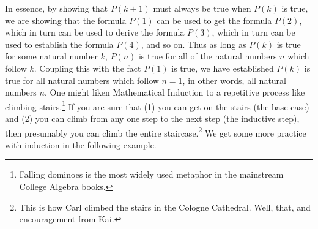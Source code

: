 \smallskip

In essence, by showing that $P(k+1)$ must always be true when $P(k)$ is true, we are showing that the formula $P(1)$ can be used to get the formula $P(2)$, which in turn can be used to derive the formula $P(3)$, which in turn can be used to establish the formula $P(4)$, and so on.  Thus as long as $P(k)$ is true for some natural number $k$, $P(n)$ is true for all of the natural numbers $n$ which follow $k$.  Coupling this with the fact $P(1)$ is true, we have established $P(k)$ is true for all natural numbers which follow $n=1$, in other words, all natural numbers $n$.  One might liken Mathematical Induction to a repetitive process like climbing stairs.\footnote{Falling dominoes is the most widely used metaphor in the mainstream College Algebra books.}  If you are sure that (1) you can get on the stairs (the base case) and (2) you can climb from any one step to the next step (the inductive step), then presumably you can climb the entire staircase.\footnote{This is how Carl climbed the stairs in the Cologne Cathedral.  Well, that, and  encouragement from  Kai.}  We get some more practice with induction in the following example.

